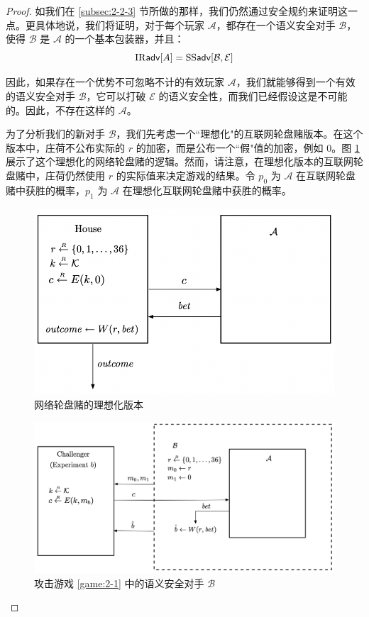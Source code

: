 \begin{proof}
如我们在 \ref{subsec:2-2-3} 节所做的那样，我们仍然通过安全规约来证明这一点。更具体地说，我们将证明，对于每个玩家 $\mathcal{A}$，都存在一个语义安全对手 $\mathcal{B}$，使得 $\mathcal{B}$ 是 $\mathcal{A}$ 的一个基本包装器，并且：
\begin{equation}\label{eq:2-7}
{\rm IR\mathsf{adv}}[A]={\rm SS\mathsf{adv}}[\mathcal{B},\mathcal{E}]
\end{equation}

因此，如果存在一个优势不可忽略不计的有效玩家 $\mathcal{A}$，我们就能够得到一个有效的语义安全对手 $\mathcal{B}$，它可以打破 $\mathcal{E}$ 的语义安全性，而我们已经假设这是不可能的。因此，不存在这样的 $\mathcal{A}$。

为了分析我们的新对手 $\mathcal{B}$，我们先考虑一个``理想化"的互联网轮盘赌版本。在这个版本中，庄荷不公布实际的 $r$ 的加密，而是公布一个``假"值的加密，例如 $0$。图 \ref{fig:2-3} 展示了这个理想化的网络轮盘赌的逻辑。然而，请注意，在理想化版本的互联网轮盘赌中，庄荷仍然使用 $r$ 的实际值来决定游戏的结果。令 $p_0$ 为 $\mathcal{A}$ 在互联网轮盘赌中获胜的概率，$p_1$ 为 $\mathcal{A}$ 在理想化互联网轮盘赌中获胜的概率。

\begin{figure}
  \centering
  \includegraphics[width=0.6\linewidth]{figures/chapter2/fig3.png}
  \caption{网络轮盘赌的理想化版本}
  \label{fig:2-3}
\end{figure}

\begin{figure}
  \centering
  \includegraphics[width=0.85\linewidth]{figures/chapter2/fig4.png}
  \caption{攻击游戏 \ref{game:2-1} 中的语义安全对手 $\mathcal{B}$}
  \label{fig:2-4}
\end{figure}


\end{proof}
